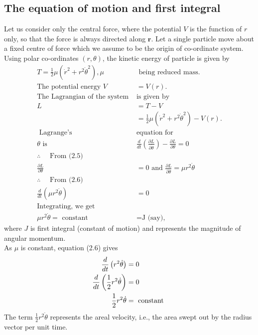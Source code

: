 \subsection{The equation of motion and first integral}
Let us consider only the central force, where the potential $V$ is the function of $r$ only, so that the force is always directed along $\mathbf{r}$. Let a single particle move about a fixed centre of force which we assume to be the origin of co-ordinate system. Using polar co-ordinates $(r, \theta)$, the kinetic energy of particle is given by
\begin{align}
T=\frac{1}{2} \mu\left(\dot{r}^{2}+r^{2} \dot{\theta}^{2}\right), \mu&\text{ being reduced mass.}\\
\text{The potential energy }V&=V(r).\\
\text{The Lagrangian of the system }&\text{is given by}\\
L&=T-V \\
&=\frac{1}{2} \mu\left(\dot{r}^{2}+r^{2} \dot{\theta}^{2}\right)-V(r) .\\
\text { Lagrange's  }&\text{equation for}\\
 \theta \text { is } &\frac{d}{d t}\left(\frac{\partial L}{\partial \dot{\theta}}\right)-\frac{\partial L}{\partial \theta}=0\\
 \therefore \quad\text{ From (2.5)}\\
 \frac{\partial L}{\partial \theta}&=0 \text { and } \frac{\partial L}{\partial \dot{\theta}}=\mu r^{2} \dot{\theta}\\
 \therefore \quad\text{ From (2.6)}\\
 \frac{d}{d t}\left(\mu r^{2} \dot{\theta}\right)&=0\\
 \text{Integrating, we get}\\
 \mu r^{2} \dot{\theta}=\text{ constant }&=\text{J (say),}
\end{align}
where $J$ is first integral (constant of motion) and represents the magnitude of angular momentum.\\
As $\mu$ is constant, equation (2.6) gives
\begin{align}
	\frac{d}{d t}\left(r^{2} \dot{\theta}\right)&=0 \notag\\
	\frac{d}{d t}\left(\frac{1}{2} r^{2} \dot{\theta}\right)&=0 \notag\\
	\frac{1}{2} r^{2} \dot{\theta}&=\text { constant }\label{eq6}
\end{align}
The term $\frac{1}{2} r^{2} \dot{\theta}$ represents the areal velocity, i.e., the area swept out by the radius vector per unit time.
